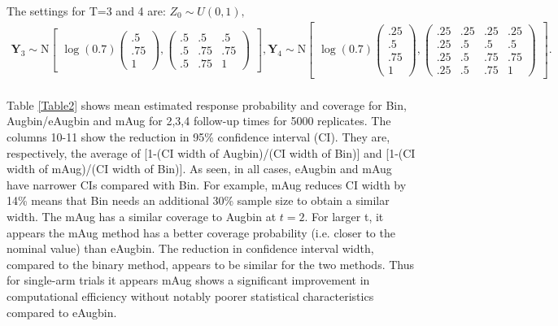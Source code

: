\documentclass[10pt,A4]{article}
\begin{document}
The settings for T=3 and 4 are: $Z_0 \sim U(0,1),$
\begin{align*}
\textbf{Y}_{3}\sim  \text{N}
\begin{bmatrix}
\log(0.7)
\begin{pmatrix}
.5\\
.75\\
1
\end{pmatrix}\!\!,
\begin{pmatrix}
.5 & .5 & .5\\
.5 & .75 & .75\\
.5 & .75 & 1
\end{pmatrix}
\end{bmatrix}
,\textbf{Y}_{4}\sim  \text{N}
\begin{bmatrix}
\log(0.7)
\begin{pmatrix}
.25\\
.5\\
.75\\
1
\end{pmatrix}\!\!,
\begin{pmatrix}
.25 & .25& .25& .25\\
.25 & .5 & .5 & .5\\
.25& .5 & .75 & .75\\
.25& .5 & .75 & 1
\end{pmatrix}
\end{bmatrix}.\\
\end{align*}

Table \ref{Table2} shows mean estimated response probability and coverage for Bin, Augbin/eAugbin and mAug for 2,3,4 follow-up times for 5000 replicates. The columns 10-11 show the reduction in 95\% confidence interval (CI). They are, respectively, the average of [1-(CI width of Augbin)/(CI width of Bin)] and [1-(CI width of mAug)/(CI width of Bin)]. As seen, in all cases, eAugbin and mAug have narrower CIs compared with Bin. For example, mAug reduces CI width by 14\% means that Bin needs an additional 30\% sample size to obtain a similar width. The mAug has a similar coverage to Augbin at $t=2$. For larger t, it appears the mAug method has a better coverage probability (i.e. closer to the nominal value) than eAugbin. The reduction in confidence interval width, compared to the binary method, appears to be similar for the two methods. Thus for single-arm trials it appears mAug shows a significant improvement in computational efficiency without notably poorer statistical characteristics compared to eAugbin.\\
\end{document}
